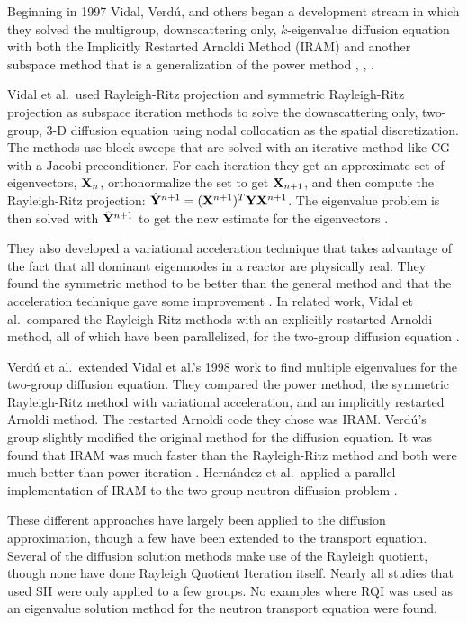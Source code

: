Beginning in 1997 Vidal, Verd\'u, and others began a development stream in which they solved the multigroup, downscattering only, $k$-eigenvalue diffusion equation with both the Implicitly Restarted Arnoldi Method (IRAM) and another subspace method that is a generalization of the power method \cite{Vidal1997}, \cite{Vidal1998}, \cite{Verdu1999}. 

Vidal et al.\ used Rayleigh-Ritz projection and symmetric Rayleigh-Ritz projection as subspace iteration methods to solve the downscattering only, two-group, 3-D diffusion equation using nodal collocation as the spatial discretization. The methods use block sweeps that are solved with an iterative method like CG with a Jacobi preconditioner. For each iteration they get an approximate set of eigenvectors, $\mathbf{X}_{n}$, orthonormalize the set to get $\mathbf{X}_{n+1}$, and then compute the Rayleigh-Ritz projection: $\hat{\mathbf{Y}}^{n+1} = (\mathbf{X}^{n+1})^{T} \mathbf{Y} \mathbf{X}^{n+1}$. The eigenvalue problem is then solved with $\hat{\mathbf{Y}}^{n+1}$ to get the new estimate for the eigenvectors \cite{Vidal1998}. 

They also developed a variational acceleration technique that takes advantage of the fact that all dominant eigenmodes in a reactor are physically real. They found the symmetric method to be better than the general method and that the acceleration technique gave some improvement \cite{Vidal1998}. In related work, Vidal et al.\ compared the Rayleigh-Ritz methods with an explicitly restarted Arnoldi method, all of which have been parallelized, for the two-group diffusion equation \cite{Vidal1997}. 

Verd\'u et al.\ extended Vidal et al.'s 1998 work \cite{Vidal1998} to find multiple eigenvalues for the two-group diffusion equation. They compared the power method, the symmetric Rayleigh-Ritz method with variational acceleration, and an implicitly restarted Arnoldi method. The restarted Arnoldi code they chose was IRAM. Verd\'u's group slightly modified the original method for the diffusion equation. It was found that IRAM was much faster than the Rayleigh-Ritz method and both were much better than power iteration \cite{Verdu1999}. Hern\'andez et al.\ applied a parallel implementation of IRAM to the two-group neutron diffusion problem \cite{Hernandez1998}.

These different approaches have largely been applied to the diffusion approximation, though a few have been extended to the transport equation. Several of the diffusion solution methods make use of the Rayleigh quotient, though none have done Rayleigh Quotient Iteration itself. Nearly all studies that used SII were only applied to a few groups. No examples where RQI was used as an eigenvalue solution method for the neutron transport equation were found. 


